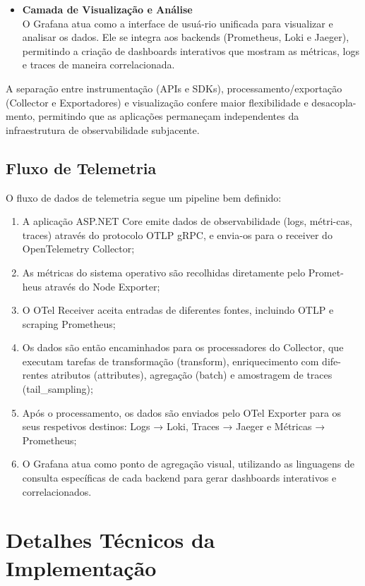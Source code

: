 \begin{itemize}
    \item \textbf{Camada de Visualização e Análise} \\ O Grafana atua como a interface de usuá-rio unificada para visualizar e analisar os dados. Ele se integra aos backends (Prometheus, Loki e Jaeger), permitindo a criação de dashboards interativos que mostram as métricas, logs e traces de maneira correlacionada.
\end{itemize}


A separação entre instrumentação (APIs e SDKs), processamento/exportação (Collector e Exportadores) e visualização confere maior flexibilidade e desacopla-mento, permitindo que as aplicações permaneçam independentes da infraestrutura de observabilidade subjacente.


\subsection{Fluxo de Telemetria}

O fluxo de dados de telemetria segue um pipeline bem definido:

\begin{enumerate}
    \item A aplicação ASP.NET Core emite dados de observabilidade (logs, métri-cas, traces) através do protocolo OTLP gRPC, e envia-os para o receiver do OpenTelemetry Collector;
    \item As métricas do sistema operativo são recolhidas diretamente pelo Promet-heus através do Node Exporter;
    \item O OTel Receiver aceita entradas de diferentes fontes, incluindo OTLP e scraping Prometheus;
    \item Os dados são então encaminhados para os processadores do Collector, que executam tarefas de transformação (transform), enriquecimento com dife-rentes atributos (attributes), agregação (batch) e amostragem de traces (tail\_sampling);
    \item Após o processamento, os dados são enviados pelo OTel Exporter para os seus respetivos destinos: Logs → Loki, Traces → Jaeger e Métricas → Prometheus;
    \item O Grafana atua como ponto de agregação visual, utilizando as linguagens de consulta específicas de cada backend para gerar dashboards interativos e correlacionados.
\end{enumerate}

\section{Detalhes Técnicos da Implementação}

